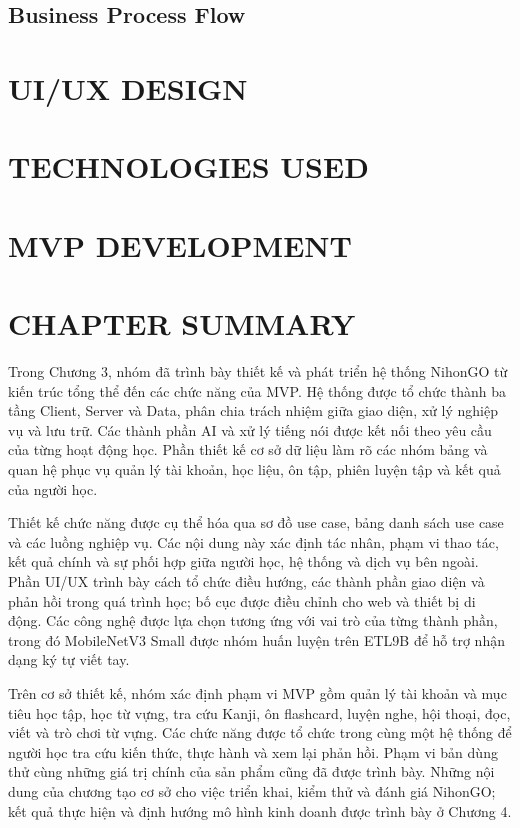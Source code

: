 \subsection{Business Process Flow}

\clearpage
\section{UI/UX DESIGN}

\clearpage
\section{TECHNOLOGIES USED}


\clearpage
\section{MVP DEVELOPMENT}

\clearpage
\section{CHAPTER SUMMARY}
Trong Chương 3, nhóm đã trình bày thiết kế và phát triển hệ thống NihonGO từ kiến trúc tổng thể đến các chức năng của MVP. Hệ thống được tổ chức thành ba tầng Client, Server và Data, phân chia trách nhiệm giữa giao diện, xử lý nghiệp vụ và lưu trữ. Các thành phần AI và xử lý tiếng nói được kết nối theo yêu cầu của từng hoạt động học. Phần thiết kế cơ sở dữ liệu làm rõ các nhóm bảng và quan hệ phục vụ quản lý tài khoản, học liệu, ôn tập, phiên luyện tập và kết quả của người học.

Thiết kế chức năng được cụ thể hóa qua sơ đồ use case, bảng danh sách use case và các luồng nghiệp vụ. Các nội dung này xác định tác nhân, phạm vi thao tác, kết quả chính và sự phối hợp giữa người học, hệ thống và dịch vụ bên ngoài. Phần UI/UX trình bày cách tổ chức điều hướng, các thành phần giao diện và phản hồi trong quá trình học; bố cục được điều chỉnh cho web và thiết bị di động. Các công nghệ được lựa chọn tương ứng với vai trò của từng thành phần, trong đó MobileNetV3 Small được nhóm huấn luyện trên ETL9B để hỗ trợ nhận dạng ký tự viết tay.

Trên cơ sở thiết kế, nhóm xác định phạm vi MVP gồm quản lý tài khoản và mục tiêu học tập, học từ vựng, tra cứu Kanji, ôn flashcard, luyện nghe, hội thoại, đọc, viết và trò chơi từ vựng. Các chức năng được tổ chức trong cùng một hệ thống để người học tra cứu kiến thức, thực hành và xem lại phản hồi. Phạm vi bản dùng thử cùng những giá trị chính của sản phẩm cũng đã được trình bày. Những nội dung của chương tạo cơ sở cho việc triển khai, kiểm thử và đánh giá NihonGO; kết quả thực hiện và định hướng mô hình kinh doanh được trình bày ở Chương 4.

